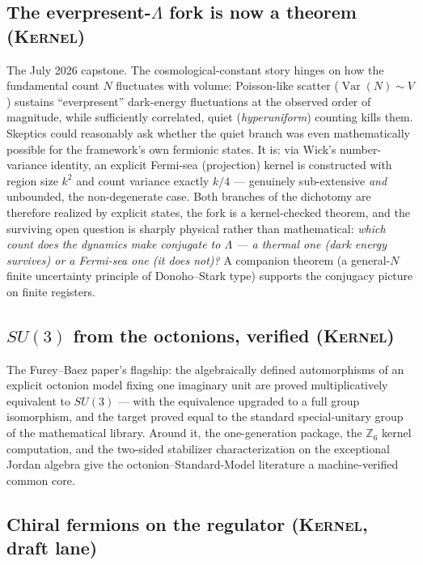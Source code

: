 \documentclass[11pt]{article}
\newcommand{\Kernel}{\textcolor{kernelcolor}{\textsc{Kernel}}}
\newcommand{\Lam}{\Lambda}
\newcommand{\Var}{\operatorname{Var}}
\begin{document}
\subsection{The everpresent-$\Lam$ fork is now a theorem (\Kernel)}

The July 2026 capstone.  The cosmological-constant story hinges on how the
fundamental count $N$ fluctuates with volume: Poisson-like scatter
($\Var(N)\sim V$) sustains ``everpresent'' dark-energy fluctuations at the
observed order of magnitude, while sufficiently correlated, quiet
(\emph{hyperuniform}) counting kills them.  Skeptics could reasonably ask
whether the quiet branch was even mathematically possible for the
framework's own fermionic states.  It is: via Wick's number-variance
identity, an explicit Fermi-sea (projection) kernel is constructed with
region size $k^2$ and count variance exactly $k/4$ --- genuinely
sub-extensive \emph{and} unbounded, the non-degenerate case.  Both
branches of the dichotomy are therefore realized by explicit states, the
fork is a kernel-checked theorem, and the surviving open question is
sharply physical rather than mathematical: \emph{which count does the
dynamics make conjugate to $\Lam$ --- a thermal one (dark energy
survives) or a Fermi-sea one (it does not)?}  A companion theorem (a
general-$N$ finite uncertainty principle of Donoho--Stark type) supports
the conjugacy picture on finite registers.

\subsection{$SU(3)$ from the octonions, verified (\Kernel)}

The Furey--Baez paper's flagship: the algebraically defined automorphisms
of an explicit octonion model fixing one imaginary unit are proved
multiplicatively equivalent to $SU(3)$ --- with the equivalence upgraded
to a full group isomorphism, and the target proved equal to the standard
special-unitary group of the mathematical library.  Around it, the
one-generation package, the $\mathbb{Z}_6$ kernel computation, and the
two-sided stabilizer characterization on the exceptional Jordan algebra
give the octonion--Standard-Model literature a machine-verified
common core.

\subsection{Chiral fermions on the regulator (\Kernel, draft lane)}
\end{document}
